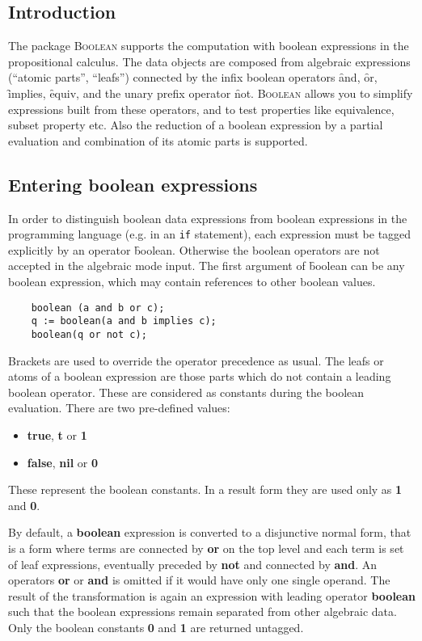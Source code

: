 

\subsection{Introduction}

The package \textsc{Boolean} supports the computation with
boolean expressions in the propositional calculus.
The data objects are composed from algebraic expressions (``atomic parts'', ``leafs'')
connected by the infix boolean operators \f{and}, \f{or}, 
\f{implies}, \f{equiv}, and the unary prefix operator
\f{not}. \textsc{Boolean} allows you to simplify expressions
built from these operators, and to test properties like
equivalence, subset property etc. Also the reduction of
a boolean expression by a partial evaluation and combination
of its atomic parts is supported.

\subsection{Entering boolean expressions}

In order to distinguish boolean data expressions from 
boolean expressions in the \REDUCE programming
language (e.g. in an \texttt{if} statement), each expression
must be tagged explicitly by an operator \f{boolean}.
Otherwise the boolean operators are not accepted in the
\REDUCE  algebraic mode input.
The first argument of \f{boolean} can be any boolean expression,
which may contain references to other boolean values.
\begin{verbatim}
    boolean (a and b or c);
    q := boolean(a and b implies c);
    boolean(q or not c);
\end{verbatim}
Brackets are used to override the operator precedence as usual.
The leafs or atoms of a boolean expression are those parts which
do not contain a leading boolean operator. These are
considered as constants during the boolean evaluation. There
are two pre-defined values:
\begin{itemize}
\item \textbf{true}, \textbf{t} or \textbf{1}
\item \textbf{false}, \textbf{nil} or \textbf{0}
\end{itemize}
These represent the boolean constants. In a result
form they are used only as \textbf{1} and \textbf{0}.

By default, a \textbf{boolean} expression is converted  to a
disjunctive normal form, that is a form where terms are connected
by \textbf{or} on the top level and each term is set of leaf
expressions, eventually preceded by \textbf{not} and connected
by  \textbf{and}. An operators \textbf{or} or \textbf{and} is omitted
if it would have only one single operand. The result of
the transformation is again an expression with leading 
operator \textbf{boolean} such that the boolean expressions
remain separated from other algebraic data. Only the boolean
constants \textbf{0} and \textbf{1} are returned untagged.

